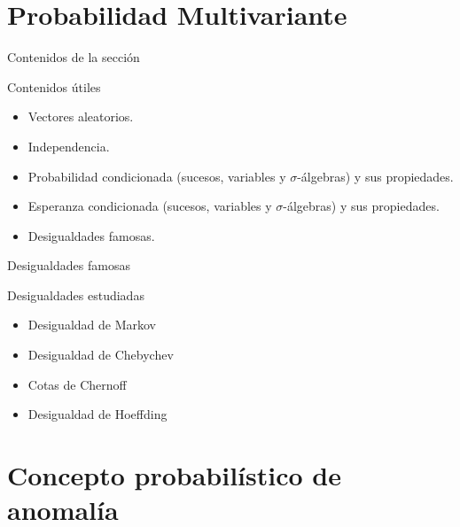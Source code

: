 \documentclass[10pt]{beamer}
\begin{document}
\section{Probabilidad Multivariante}

\begin{frame}[fragile]{Contenidos de la sección}
\vspace{10px}
\pause
{}

\begin{block}{Contenidos útiles}
	\begin{itemize}
		\item Vectores aleatorios.
		\pause
		\item Independencia.
		\pause
		\item Probabilidad condicionada (sucesos, variables y $\sigma$-álgebras) y sus propiedades.
		\pause
		\item Esperanza condicionada (sucesos, variables y $\sigma$-álgebras) y sus propiedades.
		\pause
		\item Desigualdades famosas.
	\end{itemize}
\end{block}

\end{frame}

\begin{frame}[fragile]{Desigualdades famosas}
\vspace{10px}
\pause
{}

\begin{block}{Desigualdades estudiadas}
	\begin{itemize}
		\item Desigualdad de Markov
		\item Desigualdad de Chebychev
		\item Cotas de Chernoff
		\item Desigualdad de Hoeffding
	\end{itemize}
\end{block}

\end{frame}

\section{Concepto probabilístico de anomalía}
\end{document}
